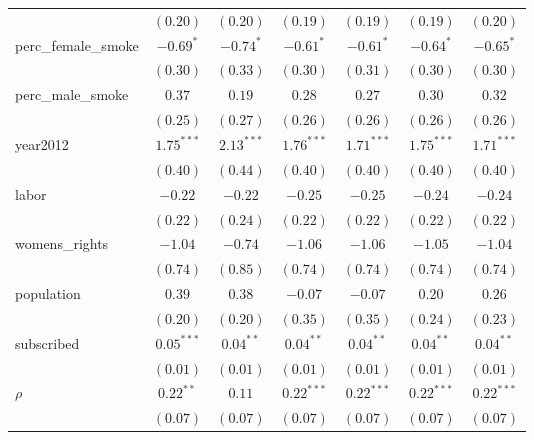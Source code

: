 \begin{table}[!h]
\begin{center}
\begin{tabular}{l c c c c c c }
                        & $(0.20)$     & $(0.20)$     & $(0.19)$     & $(0.19)$     & $(0.19)$     & $(0.20)$     \\
perc\_female\_smoke     & $-0.69^{*}$  & $-0.74^{*}$  & $-0.61^{*}$  & $-0.61^{*}$  & $-0.64^{*}$  & $-0.65^{*}$  \\
                        & $(0.30)$     & $(0.33)$     & $(0.30)$     & $(0.31)$     & $(0.30)$     & $(0.30)$     \\
perc\_male\_smoke       & $0.37$       & $0.19$       & $0.28$       & $0.27$       & $0.30$       & $0.32$       \\
                        & $(0.25)$     & $(0.27)$     & $(0.26)$     & $(0.26)$     & $(0.26)$     & $(0.26)$     \\
year2012                & $1.75^{***}$ & $2.13^{***}$ & $1.76^{***}$ & $1.71^{***}$ & $1.75^{***}$ & $1.71^{***}$ \\
                        & $(0.40)$     & $(0.44)$     & $(0.40)$     & $(0.40)$     & $(0.40)$     & $(0.40)$     \\
labor                   & $-0.22$      & $-0.22$      & $-0.25$      & $-0.25$      & $-0.24$      & $-0.24$      \\
                        & $(0.22)$     & $(0.24)$     & $(0.22)$     & $(0.22)$     & $(0.22)$     & $(0.22)$     \\
womens\_rights          & $-1.04$      & $-0.74$      & $-1.06$      & $-1.06$      & $-1.05$      & $-1.04$      \\
                        & $(0.74)$     & $(0.85)$     & $(0.74)$     & $(0.74)$     & $(0.74)$     & $(0.74)$     \\
population              & $0.39$       & $0.38$       & $-0.07$      & $-0.07$      & $0.20$       & $0.26$       \\
                        & $(0.20)$     & $(0.20)$     & $(0.35)$     & $(0.35)$     & $(0.24)$     & $(0.23)$     \\
subscribed              & $0.05^{***}$ & $0.04^{**}$  & $0.04^{**}$  & $0.04^{**}$  & $0.04^{**}$  & $0.04^{**}$  \\
                        & $(0.01)$     & $(0.01)$     & $(0.01)$     & $(0.01)$     & $(0.01)$     & $(0.01)$     \\
$\rho$                  & $0.22^{**}$  & $0.11$       & $0.22^{***}$ & $0.22^{***}$ & $0.22^{***}$ & $0.22^{***}$ \\
                        & $(0.07)$     & $(0.07)$     & $(0.07)$     & $(0.07)$     & $(0.07)$     & $(0.07)$     \\

\end{tabular}
\end{center}
\end{table}
